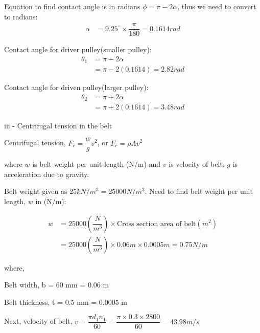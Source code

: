 \documentclass[a4paper, fleqn]{article}
\begin{document}
Equation to find contact angle is in radians $\phi = \pi - 2\alpha$, thus we need to
convert to radians:
\begin{equation*}
    \begin{aligned}
    \alpha &= 9.25^{\circ} \times \dfrac{\pi}{180} = 0.1614 rad
    \end{aligned}
\end{equation*}

Contact angle for driver pulley(smaller pulley):
\begin{equation*}
    \begin{aligned}
    \theta_1 &= \pi - 2\alpha\\
    &= \pi - 2(0.1614) = 2.82 rad
    \end{aligned}
\end{equation*}

Contact angle for driven pulley(larger pulley):
\begin{equation*}
    \begin{aligned}
    \theta_2 &= \pi + 2\alpha\\
    &= \pi + 2(0.1614) = 3.48 rad
    \end{aligned}
\end{equation*}

iii - Centrifugal tension in the belt

Centrifugal tension, $F_c = \dfrac{w}{g} v^2$, or {$F_c = \rho A v^2$}

where $w$ is belt weight per unit length (N/m) and $v$ is velocity of belt. $g$ is acceleration due to gravity.

Belt weight given as $25 kN/m^3 = 25000 N/m^3$. Need to find belt weight per unit length, $w$ in (N/m): 

\begin{equation*}
    \begin{aligned}
    w &= 25000 \left(\dfrac{N}{m^3}\right) \times \text{Cross section area of belt} (m^2) \\
    &= 25000 \left(\dfrac{N}{m^3}\right) \times 0.06m \times 0.0005m = 0.75 N/m
    \end{aligned}
\end{equation*}

where,

Belt width, b = 60 mm = 0.06 m

Belt thickness, t = 0.5 mm = 0.0005 m

Next, velocity of belt, $v = \dfrac{\pi d_1 n_1}{60} = \dfrac{\pi \times 0.3 \times 2800}{60} = 43.98 m/s$\\
\end{document}
